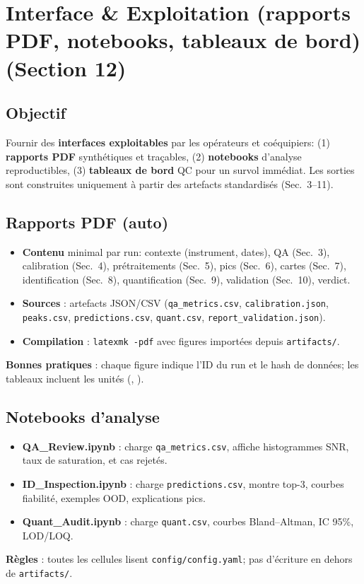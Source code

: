 
\section{Interface \& Exploitation (rapports PDF, notebooks, tableaux de bord) (Section 12)}

\subsection{Objectif}
Fournir des \textbf{interfaces exploitables} par les opérateurs et coéquipiers: 
(1) \textbf{rapports PDF} synthétiques et traçables, 
(2) \textbf{notebooks} d'analyse reproductibles, 
(3) \textbf{tableaux de bord} QC pour un survol immédiat. 
Les sorties sont construites uniquement à partir des artefacts standardisés (Sec.~3--11).

\subsection{Rapports PDF (auto)}
\begin{itemize}[nosep]
\item \textbf{Contenu} minimal par run: contexte (instrument, dates), QA (Sec.~3), calibration (Sec.~4), prétraitements (Sec.~5), pics (Sec.~6), cartes (Sec.~7), identification (Sec.~8), quantification (Sec.~9), validation (Sec.~10), verdict.
\item \textbf{Sources} : artefacts JSON/CSV (\texttt{qa\_metrics.csv}, \texttt{calibration.json}, \texttt{peaks.csv}, \texttt{predictions.csv}, \texttt{quant.csv}, \texttt{report\_validation.json}).
\item \textbf{Compilation} : \texttt{latexmk -pdf} avec figures importées depuis \texttt{artifacts/}.
\end{itemize}
\textbf{Bonnes pratiques} : chaque figure indique l'ID du run et le hash de données; les tableaux incluent les unités (\cm, \um).

\subsection{Notebooks d'analyse}
\begin{itemize}[nosep]
\item \textbf{QA\_Review.ipynb} : charge \texttt{qa\_metrics.csv}, affiche histogrammes SNR, taux de saturation, et cas rejetés.
\item \textbf{ID\_Inspection.ipynb} : charge \texttt{predictions.csv}, montre top-3, courbes fiabilité, exemples OOD, explications pics.
\item \textbf{Quant\_Audit.ipynb} : charge \texttt{quant.csv}, courbes Bland--Altman, IC 95\%, LOD/LOQ.
\end{itemize}
\textbf{Règles} : toutes les cellules lisent \texttt{config/config.yaml}; pas d'écriture en dehors de \texttt{artifacts/}.

